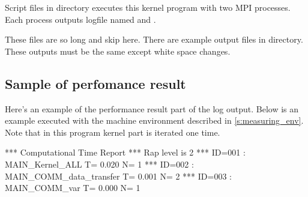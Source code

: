 Script files in  directory executes this kernel program with
two MPI processes.
Each process outputs logfile named  and
.

These files are so long and skip here.
%
There are example output files in  directory.
%
These outputs must be the same except white space changes.


\subsection{Sample of perfomance result}

Here's an example of the performance result part of the log output.
Below is an example executed with the machine environment described in \autoref{s:measuring_env}.
%
Note that in this program kernel part is iterated one time.

\begin{LstLog}
 *** Computational Time Report
 *** Rap level is            2
 *** ID=001 : MAIN_Kernel_ALL                  T=     0.020 N=        1
 *** ID=002 : MAIN_COMM_data_transfer          T=     0.001 N=        2
 *** ID=003 : MAIN_COMM_var                    T=     0.000 N=        1
\end{LstLog}
